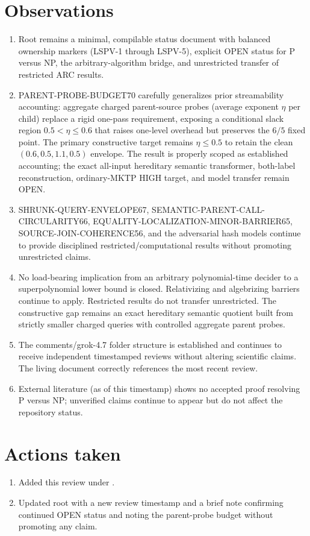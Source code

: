 \documentclass[11pt]{article}
\begin{document}
\section{Observations}
\begin{enumerate}
\item Root  remains a minimal, compilable status document with balanced ownership markers (LSPV-1 through LSPV-5), explicit OPEN status for P versus NP, the arbitrary-algorithm bridge, and unrestricted transfer of restricted ARC results.
\item PARENT-PROBE-BUDGET70 carefully generalizes prior streamability accounting: aggregate charged parent-source probes (average exponent $\eta$ per child) replace a rigid one-pass requirement, exposing a conditional slack region $0.5<\eta\le 0.6$ that raises one-level overhead but preserves the $6/5$ fixed point. The primary constructive target remains $\eta\le 0.5$ to retain the clean $(0.6,0.5,1.1,0.5)$ envelope. The result is properly scoped as established accounting; the exact all-input hereditary semantic transformer, both-label reconstruction, ordinary-MKTP HIGH target, and model transfer remain OPEN.
\item SHRUNK-QUERY-ENVELOPE67, SEMANTIC-PARENT-CALL-CIRCULARITY66, EQUALITY-LOCALIZATION-MINOR-BARRIER65, SOURCE-JOIN-COHERENCE56, and the adversarial hash models continue to provide disciplined restricted/computational results without promoting unrestricted claims.
\item No load-bearing implication from an arbitrary polynomial-time decider to a superpolynomial lower bound is closed. Relativizing and algebrizing barriers continue to apply. Restricted results do not transfer unrestricted. The constructive gap remains an exact hereditary semantic quotient built from strictly smaller charged queries with controlled aggregate parent probes.
\item The comments/grok-4.7 folder structure is established and continues to receive independent timestamped reviews without altering scientific claims. The living document correctly references the most recent review.
\item External literature (as of this timestamp) shows no accepted proof resolving P versus NP; unverified claims continue to appear but do not affect the repository status.
\end{enumerate}

\section{Actions taken}
\begin{enumerate}
\item Added this review under .
\item Updated root  with a new review timestamp and a brief note confirming continued OPEN status and noting the parent-probe budget without promoting any claim.
\end{enumerate}
\end{document}
